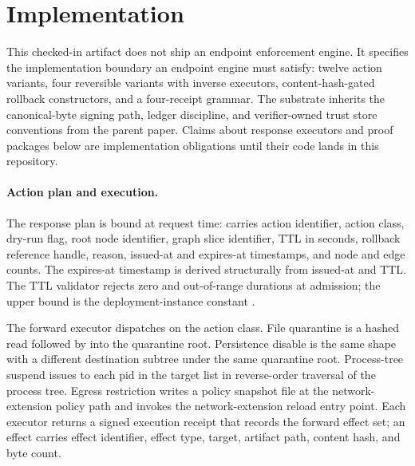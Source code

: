 \section{Implementation}
\label{sec:implementation-ra}

This checked-in artifact does not ship an endpoint enforcement engine.
It specifies the implementation boundary an endpoint engine must satisfy:
twelve action variants, four reversible variants with inverse executors,
content-hash-gated rollback constructors, and a four-receipt grammar. The
substrate inherits the canonical-byte signing path, ledger discipline,
and verifier-owned trust store conventions from the parent paper. Claims
about response executors and proof packages below are implementation
obligations until their code lands in this repository.

\paragraph{Action plan and execution.}
The response plan is bound at request time:
 carries action identifier, action
class, dry-run flag, root node identifier, graph slice identifier,
TTL in seconds, rollback reference handle, reason, issued-at and
expires-at timestamps, and node and edge counts. The expires-at
timestamp is derived structurally from issued-at and TTL. The TTL
validator rejects zero and out-of-range durations at admission; the
upper bound is the deployment-instance constant
.

The forward executor dispatches on the action class. File quarantine
is a hashed read followed by  into the quarantine
root. Persistence disable is the same shape with a different
destination subtree under the same quarantine root. Process-tree
suspend issues  to each pid in the target
list in reverse-order traversal of the process tree. Egress
restriction writes a policy snapshot file at the network-extension
policy path and invokes the network-extension reload entry point. Each
executor returns a signed execution receipt that records the forward
effect set; an effect carries effect identifier, effect type, target,
artifact path, content hash, and byte count.

